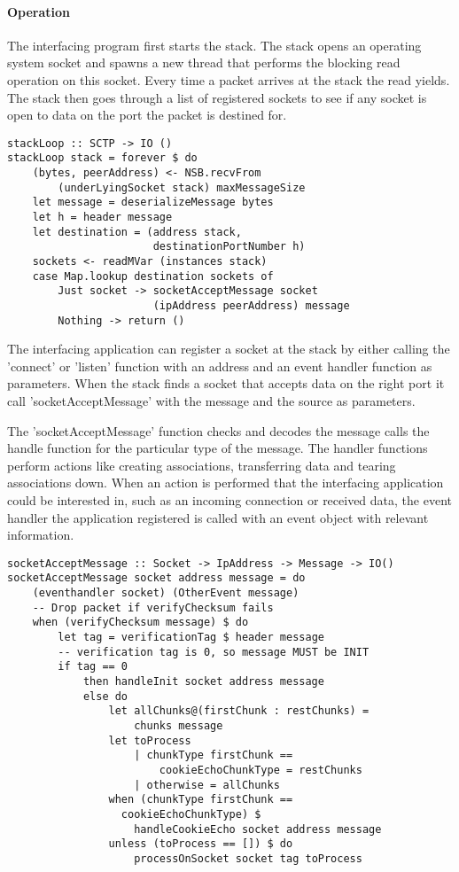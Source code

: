 \paragraph{Operation}
The interfacing program first starts the stack. The stack opens an operating system socket and spawns a new thread that performs the blocking read operation on this socket. Every time a packet arrives at the stack the read yields. The stack then goes through a list of registered sockets to see if any socket is open to data on the port the packet is destined for.

\begin{lstlisting}[caption={The stack loop}]
stackLoop :: SCTP -> IO ()
stackLoop stack = forever $ do
    (bytes, peerAddress) <- NSB.recvFrom 
        (underLyingSocket stack) maxMessageSize
    let message = deserializeMessage bytes
    let h = header message
    let destination = (address stack,
                       destinationPortNumber h)
    sockets <- readMVar (instances stack)
    case Map.lookup destination sockets of
        Just socket -> socketAcceptMessage socket
                       (ipAddress peerAddress) message
        Nothing -> return ()
\end{lstlisting}
The interfacing application can register a socket at the stack by either calling the 'connect' or 'listen' function with an address and an event handler function as parameters.
When the stack finds a socket that accepts data on the right port it call 'socketAcceptMessage' with the message and the source as parameters.

The 'socketAcceptMessage' function checks and decodes the message calls the handle function for the particular type of the message. The handler functions perform actions like creating associations, transferring data and tearing associations down. When an action is performed that the interfacing application could be interested in, such as an incoming connection or received data, the event handler the application registered is called with an event object with relevant information.

\begin{lstlisting}[caption={socketAcceptMessage decides what to do with a message}]
socketAcceptMessage :: Socket -> IpAddress -> Message -> IO()
socketAcceptMessage socket address message = do
    (eventhandler socket) (OtherEvent message)
    -- Drop packet if verifyChecksum fails
    when (verifyChecksum message) $ do
        let tag = verificationTag $ header message
        -- verification tag is 0, so message MUST be INIT
        if tag == 0 
            then handleInit socket address message
            else do
                let allChunks@(firstChunk : restChunks) =
                    chunks message
                let toProcess
                    | chunkType firstChunk ==
                        cookieEchoChunkType = restChunks
                    | otherwise = allChunks
                when (chunkType firstChunk == 
                  cookieEchoChunkType) $
                    handleCookieEcho socket address message
                unless (toProcess == []) $ do
                    processOnSocket socket tag toProcess
\end{lstlisting}


